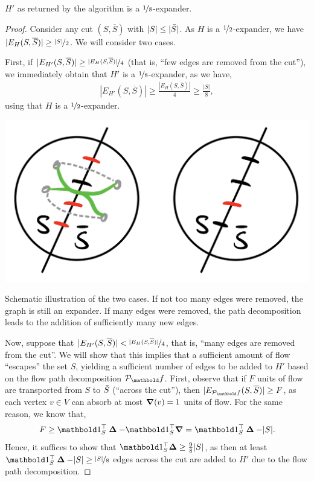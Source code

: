 \documentclass{tufte-handout}
\newcommand{\cut}{(S, \overline{S})}
\newcommand{\pathdecomp}{\mathcal{P}_\vf}
\begin{document}
\begin{thm}
$H'$ as returned by the algorithm is a $\nicefrac{1}{8}$-expander.
\end{thm}
\begin{proof}
Consider any cut $\cut$ with $|S| \leq |\Bar{S}|$. As $H$ is a $\nicefrac{1}{2}$-expander, we have $|E_H\cut| \geq \nicefrac{|S|}{2}$. We will consider two cases.

First, if $|E_{H'}\cut| \geq \nicefrac{|E_H\cut|}{4}$ (that is, ``few edges are removed from the cut''), we immediately obtain that $H'$ is a $\nicefrac{1}{8}$-expander, as we have, \begin{align*}
    |E_{H'}\cut| \geq \frac{|E_H\cut|}{4} \geq \frac{|S|}{8},
\end{align*} using that $H$ is a $\nicefrac{1}{2}$-expander.

\begin{marginfigure}[7\baselineskip]
\includegraphics[width=\textwidth]{assignments/figures/cuts.png}
\caption{Schematic illustration of the two cases. If not too many edges were removed, the graph is still an expander. If many edges were removed, the path decomposition leads to the addition of sufficiently many new edges.}
\end{marginfigure}

Now, suppose that $|E_{H'}\cut| < \nicefrac{|E_H\cut|}{4}$, that is, ``many edges are removed from the cut''. We will show that this implies that a sufficient amount of flow ``escapes'' the set $S$, yielding a sufficient number of edges to be added to $H'$ based on the flow path decomposition $\pathdecomp$. First, observe that if $F$ units of flow are transported from $S$ to $\Bar{S}$ (``across the cut''), then $|E_{\pathdecomp}\cut| \geq F$, as each vertex $v \in V$ can absorb at most $\boldsymbol{\nabla}(v) = 1$ units of flow. For the same reason, we know that, \begin{align*}
    F \geq \trans{\vOne_S}\vDelta - \trans{\vOne_S}\vnabla = \trans{\vOne_S}\vDelta - |S|.
\end{align*} Hence, it suffices to show that $\trans{\vOne_S}\vDelta \geq \frac{9}{8}|S|$, as then at least $\trans{\vOne_S}\vDelta - |S| \geq \nicefrac{|S|}{8}$ edges across the cut are added to $H'$ due to the flow path decomposition.


\end{proof}
\end{document}
